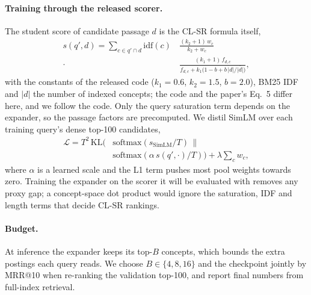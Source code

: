 \paragraph{Training through the released scorer.}
The student score of candidate passage $d$ is the CL-SR formula itself,
\begin{equation}
\begin{split}
  s(q',d)=\sum_{c\in q'\cap d}\mathrm{idf}(c)\,
  &\frac{(k_2+1)\,w_c}{k_2+w_c}\\
  \cdot\,&\frac{(k_1+1)\,f_{d,c}}{f_{d,c}+k_1\bigl(1-b+b\,|d|/\overline{|d|}\bigr)},
\end{split}
\end{equation}
with the constants of the released code ($k_1=0.6$, $k_2=1.5$, $b=2.0$), BM25 IDF and $|d|$ the number of
indexed concepts; the code and the paper's Eq.~5 differ here, and we follow the code. Only the query
saturation term depends on the expander, so the passage factors are precomputed. We distil SimLM over each
training query's dense top-100 candidates,
\begin{equation}
\begin{split}
  \mathcal{L}=T^2\,\mathrm{KL}\bigl(&\mathrm{softmax}(s_{\text{SimLM}}/T)\,\big\|\\
  &\mathrm{softmax}(\alpha\, s(q',\cdot)/T)\bigr)+\lambda\sum_{c} w_c ,
\end{split}
\end{equation}
where $\alpha$ is a learned scale and the L1 term pushes most pool weights towards zero. Training the
expander on the scorer it will be evaluated with removes any proxy gap; a concept-space dot product would
ignore the saturation, IDF and length terms that decide CL-SR rankings.

\paragraph{Budget.}
At inference the expander keeps its top-$B$ concepts, which bounds the extra postings each query reads. We
choose $B\in\{4,8,16\}$ and the checkpoint jointly by MRR@10 when re-ranking the validation top-100, and
report final numbers from full-index retrieval.

